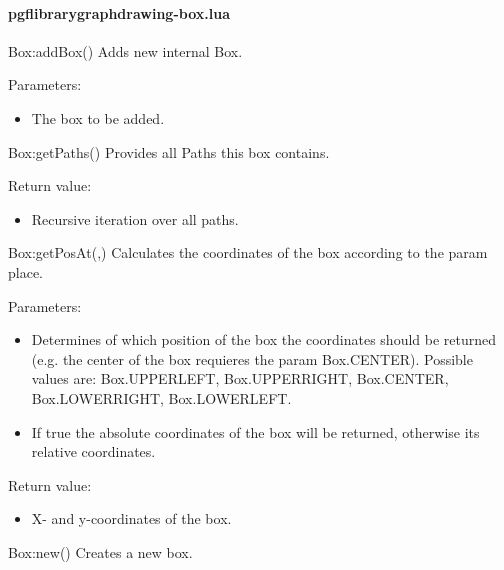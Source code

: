 
\paragraph{pgflibrarygraphdrawing-box.lua}


\begin{luacommand}{{Box:addBox}()}
Adds new internal Box.

Parameters:
\begin{itemize}
	\item[]  \subitem The box to be added.
\end{itemize}



\end{luacommand}\begin{luacommand}{{Box:getPaths}()}
Provides all Paths this box contains.


Return value:
\begin{itemize} \item[] Recursive iteration over all paths. \end{itemize}


\end{luacommand}\begin{luacommand}{{Box:getPosAt}(,)}
Calculates the coordinates of the box according to the param place.

Parameters:
\begin{itemize}
	\item[]  \subitem Determines of which position of the box the coordinates should be returned (e.g. the center of the box requieres the param Box.CENTER). Possible values are: Box.UPPERLEFT, Box.UPPERRIGHT, Box.CENTER, Box.LOWERRIGHT, Box.LOWERLEFT.\item[]  \subitem If true the absolute coordinates of the box will be returned, otherwise its relative coordinates.
\end{itemize}


Return value:
\begin{itemize} \item[] X- and y-coordinates of the box. \end{itemize}


\end{luacommand}\begin{luacommand}{{Box:new}()}
Creates a new box.


\end{luacommand}
